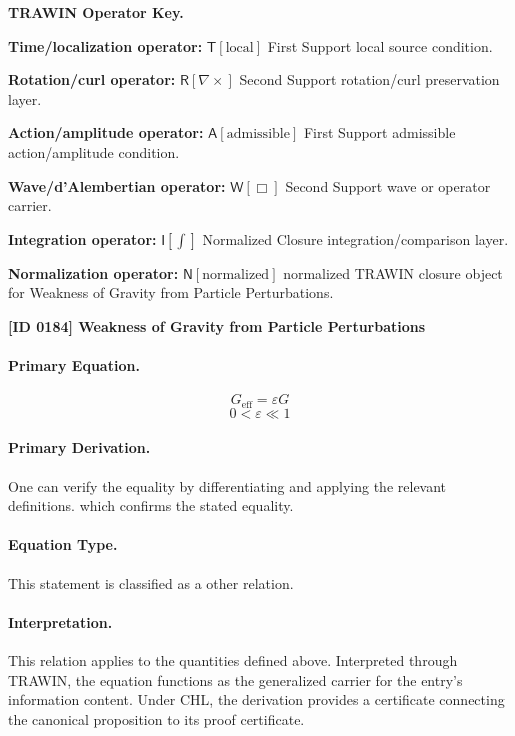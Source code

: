\par\vspace{0.45\baselineskip}
\noindent\begin{minipage}[t]{\linewidth}
\begingroup
\small
\raggedright
\textbf{TRAWIN Operator Key.}\par
\noindent\textbf{Time/localization operator:} $\mathsf{T}\!\left[\mathrm{local}\right]$ First Support local source condition.\par
\noindent\textbf{Rotation/curl operator:} $\mathsf{R}\!\left[\nabla\times\right]$ Second Support rotation/curl preservation layer.\par
\noindent\textbf{Action/amplitude operator:} $\mathsf{A}\!\left[\mathrm{admissible}\right]$ First Support admissible action/amplitude condition.\par
\noindent\textbf{Wave/d'Alembertian operator:} $\mathsf{W}\!\left[\Box\right]$ Second Support wave or operator carrier.\par
\noindent\textbf{Integration operator:} $\mathsf{I}\!\left[\int\right]$ Normalized Closure integration/comparison layer.\par
\noindent\textbf{Normalization operator:} $\mathsf{N}\!\left[\mathrm{normalized}\right]$ normalized TRAWIN closure object for Weakness of Gravity from Particle Perturbations.\par
\endgroup
\end{minipage}

\clearpage
\noindent\textbf{[ID 0184] Weakness of Gravity from Particle Perturbations}\par
\vspace{0.35em}
\paragraph{Primary Equation.}
\[
G_{\mathrm{eff}} = \varepsilon G
\]
\[
0 < \varepsilon \ll 1
\]

\paragraph{Primary Derivation.}
One can verify the equality by differentiating and applying the relevant definitions. which confirms the stated equality.
\paragraph{Equation Type.}
This statement is classified as a other relation.

\paragraph{Interpretation.}
This relation applies to the quantities defined above. Interpreted through TRAWIN, the equation functions as the generalized carrier for the entry’s information content. Under CHL, the derivation provides a certificate connecting the canonical proposition to its proof certificate.

